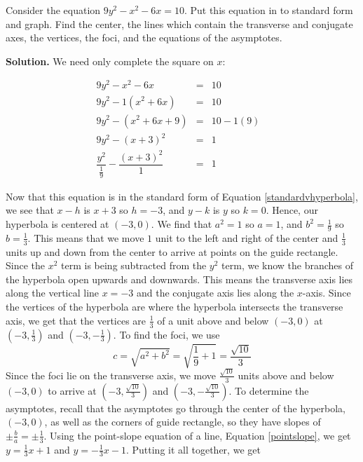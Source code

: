 \medskip

\begin{ex} \label{ctshyperbolaex} Consider the equation $9y^2-x^2-6x=10$.  Put this equation in to standard form and graph.  Find the center, the lines which contain the transverse and conjugate axes, the vertices, the foci, and the equations of the asymptotes.   

\medskip

{\bf Solution.} We need only complete the square on $x$:

\[ \begin{array}{rclr} 9y^2-x^2-6x & = & 10 & \\[5pt]
9y^2-1\left(x^2+6x\right) &  = & 10 &  \\[5pt]
9y^2-\left(x^2+6x + 9\right) &  = & 10 - 1(9) &  \\[5pt]
9y^2-(x+3)^2 &  = & 1 &  \\ [5pt]
\dfrac{y^2}{\frac{1}{9}} - \dfrac{(x+3)^2}{1} & = & 1 &  \end{array} \]

Now that this equation is in the standard form of Equation \ref{standardvhyperbola}, we see that $x-h$ is $x+3$ so $h = -3$, and $y-k$ is $y$ so $k = 0$.  Hence, our hyperbola is centered at $(-3, 0)$.  We find that $a^2 = 1$ so $a=1$, and $b^2 = \frac{1}{9}$ so  $b=\frac{1}{3}$.  This means that we move $1$ unit to the left and right of the center and $\frac{1}{3}$ units up and down from the center to arrive at points on the guide rectangle.  Since the $x^2$ term is being subtracted from the $y^2$ term, we know the branches of the hyperbola open upwards and downwards.  This means the transverse axis lies along the vertical line $x=-3$ and the conjugate axis lies along the $x$-axis.  Since the vertices of the hyperbola are where the hyperbola intersects the transverse axis, we get that the vertices are $\frac{1}{3}$ of a unit above and below $(-3, 0)$ at $\left(-3, \frac{1}{3}\right)$ and $\left(-3, -\frac{1}{3}\right)$.  To find the foci, we use \[c = \sqrt{a^2 + b^2} = \sqrt{\frac{1}{9} + 1} = \frac{\sqrt{10}}{3}\] Since the foci lie on the transverse axis, we move $\frac{\sqrt{10}}{3}$ units above and below $(-3, 0)$ to arrive at $\left(-3, \frac{\sqrt{10}}{3}\right)$ and $\left(-3, -\frac{\sqrt{10}}{3}\right)$.  To determine the asymptotes, recall that the asymptotes go through the center of the hyperbola, $(-3,0)$, as well as the corners of guide rectangle, so they have slopes of $\pm \frac{b}{a} = \pm \frac{1}{3}$.  Using the point-slope equation of a line, Equation \ref{pointslope}, we get  $y = \frac{1}{3}x + 1$ and $y = -\frac{1}{3}x - 1$.  Putting it all together, we get


\end{ex}

